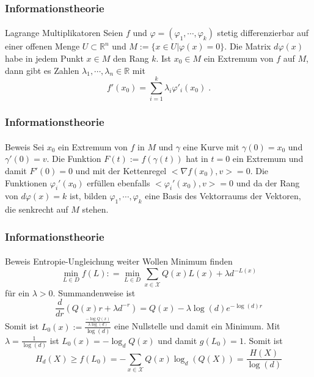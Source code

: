\documentclass{beamer}
\begin{document}
\begin{frame}
    \frametitle{Informationstheorie}
\framesubtitle{}

\begin{block}{Lagrange Multiplikatoren}
Seien $f$ und $\varphi = (\varphi_1, \cdots , \varphi_k)$ stetig differenzierbar auf einer offenen Menge $U \subset \mathbb{R}^n$ und
 $M := \{  x \in U | \varphi(x) = 0 \}$.
Die Matrix $d \varphi(x)$ habe in jedem Punkt $x \in M$ den Rang $k$. Ist $x_0 \in M$ ein Extremum von $f$ auf $M$, dann gibt es Zahlen $\lambda_1, \cdots , \lambda_n \in \mathbb{R}$ mit
$$ f'(x_0) = \sum_{i= 1}^k \lambda_i \varphi'_i(x_0) \; .$$ 
\end{block}

 \end{frame}



\begin{frame}
    \frametitle{Informationstheorie}
\framesubtitle{}

\begin{block}{Beweis}
Sei $x_0$ ein Extremum von $f$ in $M$ und $\gamma$ eine Kurve mit $\gamma(0)= x_0$ und $\gamma'(0) = v$.
Die Funktion $F(t) := f(\gamma(t))$ hat in $t= 0$ ein Extremum und damit $F'(0) = 0$ und mit der Kettenregel $<\nabla f(x_0), v> = 0$.
Die Funktionen $\varphi_i'(x_0)$ erfüllen ebenfalls $<\varphi_i' (x_0),v> = 0$ und da der Rang von $d \varphi(x)= k$ ist, bilden  $\varphi_1, \cdots , \varphi_k$ eine Basis des Vektorraums der Vektoren, die senkrecht auf $M$ stehen.
\end{block}

 \end{frame}



\begin{frame}
    \frametitle{Informationstheorie}
\framesubtitle{}

\begin{block}{Beweis Entropie-Ungleichung weiter }
Wollen Minimum finden  
$$  \min_{L \in D}  f(L): = \min_{L \in D} \sum_{x \in \mathcal{X}} Q(x) L(x) + \lambda d^{-L(x)}$$
für ein $\lambda > 0$. Summandenweise ist
$$\frac{d}{dr} (Q(x) r + \lambda d^{-r}) =  Q(x) - \lambda \log(d) e^{-\log(d)r}$$
Somit ist  $L_0(x) := \frac{\frac{- \log Q(x)}{\lambda \log(d)}}{\log(d)}$ eine Nullstelle und damit ein Minimum. Mit $\lambda = \frac{1}{\log(d)}$ ist $L_0(x) = -\log_d Q(x)$  und damit $g(L_0) = 1$. Somit ist
$$ H_d(X) \geq f(L_0) = - \sum_{x \in \mathcal{X}} Q(x) \log_d (Q(X)) = \frac{H(X)}{\log(d)}$$ 

 \end{block}

 \end{frame}
\end{document}
